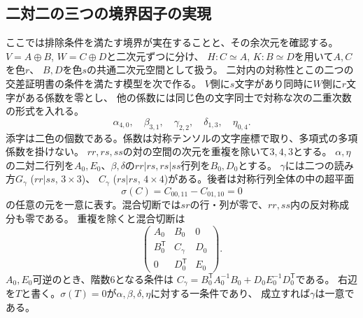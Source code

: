 \subsection{二対二の三つの境界因子の実現}
ここでは排除条件を満たす境界が実在することと、その余次元を確認する。
$V=A\oplus B$, $W=C\oplus D$と二次元ずつに分け、
$H:C\simeq A$, $K:B\simeq D$を用いて$A,C$を色$r$、
$B,D$を色$s$の共通二次元空間として扱う。
二対内の対称性とこの二つの交差証明書の条件を満たす模型を次で作る。
$V$側に$s$文字があり同時に$W$側に$r$文字がある係数を零とし、
他の係数には同じ色の文字同士で対称な次の二重次数の形式を入れる。
\[
 \alpha_{4,0},\quad\beta_{3,1},\quad\gamma_{2,2},\quad
 \delta_{1,3},\quad\eta_{0,4}.
\]
添字は二色の個数である。係数は対称テンソルの文字座標で取り、多項式の多項係数を掛けない。
$rr,rs,ss$の対の空間の次元を重複を除いて$3,4,3$とする。
$\alpha,\eta$の二対二行列を$A_0,E_0$、$\beta,\delta$の$rr|rs,rs|ss$行列を$B_0,D_0$とする。
$\gamma$には二つの読み方$G_\gamma$ ($rr|ss$, $3\times3$)、
$C_\gamma$ ($rs|rs$, $4\times4$)がある。後者は対称行列全体の中の超平面
\[
 \sigma(C)=C_{00,11}-C_{01,10}=0
\]
の任意の元を一意に表す。混合切断では$sr$の行・列が零で、$rr,ss$内の反対称成分も零である。
重複を除くと混合切断は
\[
 \begin{pmatrix}A_0&B_0&0\\ B_0^{\mathsf T}&C_\gamma&D_0\\
                 0&D_0^{\mathsf T}&E_0\end{pmatrix}.
\]
$A_0,E_0$可逆のとき、階数6となる条件は
$C_\gamma=B_0^{\mathsf T}A_0^{-1}B_0+D_0E_0^{-1}D_0^{\mathsf T}$である。
右辺を$T$と書く。$\sigma(T)=0$が$\alpha,\beta,\delta,\eta$に対する一条件であり、
成立すれば$\gamma$は一意である。

